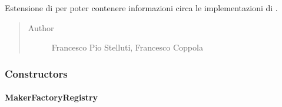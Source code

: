 \documentclass[letterpaper,10pt,italian,openany,oneside]{sphinxmanual}
\begin{document}
\begin{fulllineitems}
\label{\detokenize{source/it/unicam/cs/pa/mastermind/factories/MakerFactoryRegistry:it.unicam.cs.pa.mastermind.factories.MakerFactoryRegistry}}
Estensione di  per poter contenere informazioni circa le implementazioni di .
\begin{quote}\begin{description}
\item[{Author}] \leavevmode
Francesco Pio Stelluti, Francesco Coppola

\end{description}\end{quote}

\end{fulllineitems}



\subsubsection{Constructors}
\label{\detokenize{source/it/unicam/cs/pa/mastermind/factories/MakerFactoryRegistry:constructors}}

\paragraph{MakerFactoryRegistry}
\label{\detokenize{source/it/unicam/cs/pa/mastermind/factories/MakerFactoryRegistry:id1}}
\end{document}
